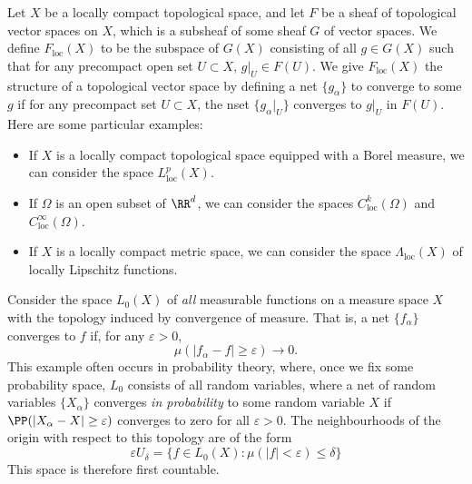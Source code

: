 \begin{example}
    Let $X$ be a locally compact topological space, and let $F$ be a sheaf of topological vector spaces on $X$, which is a subsheaf of some sheaf $G$ of vector spaces. We define $F_{\text{loc}}(X)$ to be the subspace of $G(X)$ consisting of all $g \in G(X)$ such that for any precompact open set $U \subset X$, $g|_U \in F(U)$. We give $F_{\text{loc}}(X)$ the structure of a topological vector space by defining a net $\{ g_\alpha \}$ to converge to some $g$ if for any precompact set $U \subset X$, the nset $\{ g_\alpha|_U \}$ converges to $g|_U$ in $F(U)$. Here are some particular examples:
    \begin{itemize}
        \item If $X$ is a locally compact topological space equipped with a Borel measure, we can consider the space $L^p_{\text{loc}}(X)$.
        \item If $\Omega$ is an open subset of $\RR^d$, we can consider the spaces $C^k_{\text{loc}}(\Omega)$ and $C^\infty_{\text{loc}}(\Omega)$.
        \item If $X$ is a locally compact metric space, we can consider the space $\Lambda_{\text{loc}}(X)$ of locally Lipschitz functions.
    \end{itemize}
\end{example}

\begin{example}
    Consider the space $L_0(X)$ of {\it all} measurable functions on a measure space $X$ with the topology induced by convergence of measure. That is, a net $\{ f_\alpha \}$ converges to $f$ if, for any $\varepsilon > 0$,
    \[ \mu ( |f_\alpha - f| \geq \varepsilon ) \to 0. \]
    This example often occurs in probability theory, where, once we fix some probability space, $L_0$ consists of all random variables, where a net of random variables $\{ X_\alpha \}$ converges \emph{in probability} to some random variable $X$ if $\PP(|X_\alpha - X| \geq \varepsilon)$ converges to zero for all $\varepsilon > 0$. The neighbourhoods of the origin with respect to this topology are of the form
    \[ \varepsilon U_\delta = \{ f \in L_0(X): \mu(|f| < \varepsilon) \leq \delta \} \]
    This space is therefore first countable.
\end{example}

